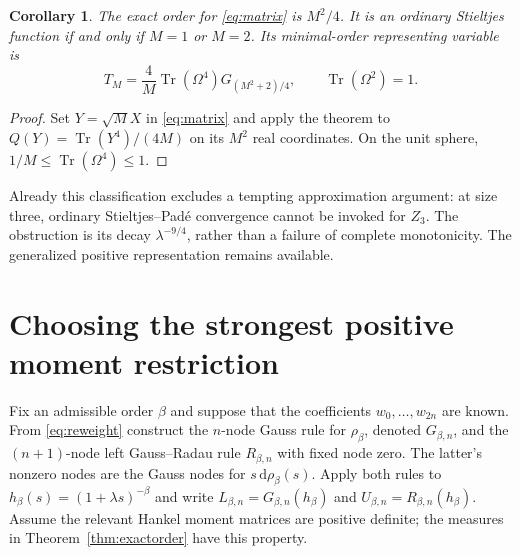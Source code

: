 \documentclass[11pt]{article}
\newtheorem{corollary}[theorem]{Corollary}
\theoremstyle{definition}
\newcommand{\Tr}{\operatorname{Tr}}
\newcommand{\dd}{\,\mathrm d}
\numberwithin{equation}{section}
\begin{document}
\begin{corollary}\label{cor:matrixorder}
The exact order for \eqref{eq:matrix} is $M^2/4$. It is an ordinary
Stieltjes function if and only if $M=1$ or $M=2$. Its minimal-order
representing variable is
\begin{equation}\label{eq:matrixrho}
 T_M=\frac4M\Tr(\Omega^4)G_{(M^2+2)/4},
 \qquad\Tr(\Omega^2)=1.
\end{equation}
\end{corollary}
\begin{proof}
Set $Y=\sqrt M X$ in \eqref{eq:matrix} and apply the theorem to
$Q(Y)=\Tr(Y^4)/(4M)$ on its $M^2$ real coordinates. On the unit sphere,
$1/M\le\Tr(\Omega^4)\le1$.
\end{proof}

Already this classification excludes a tempting approximation argument:
at size three, ordinary Stieltjes--Pad\'e convergence cannot be invoked
for $Z_3$. The obstruction is its decay $\lambda^{-9/4}$, rather than
a failure of complete monotonicity. The generalized positive
representation remains available.

\section{Choosing the strongest positive moment restriction}\label{sec:best}
Fix an admissible order $\beta$ and suppose that the coefficients
$w_0,\ldots,w_{2n}$ are known. From \eqref{eq:reweight} construct the
$n$-node Gauss rule for $\rho_\beta$, denoted $G_{\beta,n}$, and the
$(n+1)$-node left Gauss--Radau rule $R_{\beta,n}$ with fixed node zero.
The latter's nonzero nodes are the Gauss nodes for $s\dd\rho_\beta(s)$.
Apply both rules to $h_\beta(s)=(1+\lambda s)^{-\beta}$ and write
$L_{\beta,n}=G_{\beta,n}(h_\beta)$ and
$U_{\beta,n}=R_{\beta,n}(h_\beta)$.
Assume the relevant Hankel moment matrices are positive definite; the
measures in Theorem~\ref{thm:exactorder} have this property.
\end{document}
